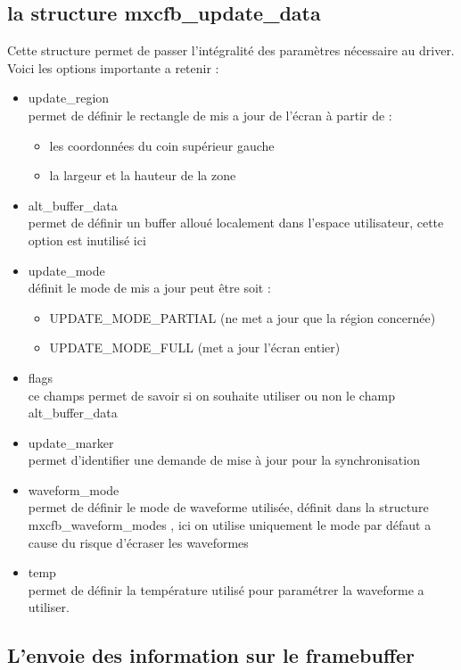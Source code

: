 \subsection{la structure mxcfb_update_data}
Cette structure permet de passer l'intégralité des paramètres nécessaire au driver.
Voici les options importante a retenir : 
\begin{itemize}
	\renewcommand{\labelitemi}{$\bullet$}
	\item update_region \\
		permet de définir le rectangle de mis a jour de l'écran à partir de :
		\begin{itemize}
			\item les coordonnées du coin supérieur gauche
			\item la largeur et la hauteur de la zone
		\end{itemize}
	\item alt_buffer_data\\
		permet de définir un buffer alloué localement dans l'espace utilisateur, 
		cette option est inutilisé ici
		
	\item update_mode \\
		définit le mode de mis a jour peut être soit :
		\begin{itemize}
			\item UPDATE_MODE_PARTIAL (ne met a jour que la région concernée)
			\item UPDATE_MODE_FULL (met a jour l'écran entier)
		\end{itemize}
	\item flags\\
		ce champs permet de savoir si on souhaite utiliser ou non le champ alt_buffer_data
	\item update_marker\\
		permet d'identifier une demande de mise à jour pour la synchronisation
	\item waveform_mode \\
		permet de définir le mode de waveforme utilisée, définit dans la structure
		mxcfb_waveform_modes , ici on utilise uniquement le mode par défaut a cause du risque 
		d'écraser les waveformes
	\item temp\\
		permet de définir la température utilisé pour paramétrer la waveforme a utiliser.
	
\end{itemize}

\subsection{L'envoie des information sur le framebuffer}

